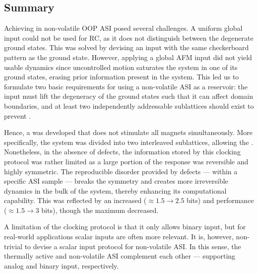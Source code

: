\subsection{Summary}
Achieving  in non-volatile OOP ASI posed several challenges.
A uniform global input could not be used for RC, as it does not distinguish between the degenerate ground states.
This was solved by devising an input with the same checkerboard pattern as the  ground state.
However, applying a global AFM input did not yield usable dynamics since uncontrolled  motion saturates the system in one of its ground states, erasing prior information present in the system.
This led us to formulate two basic requirements for using a non-volatile ASI as a reservoir: the input must lift the degeneracy of the ground states such that it can affect domain boundaries, and at least two independently addressable sublattices should exist to prevent . \par
Hence, a  was developed that does not stimulate all magnets simultaneously.
More specifically, the system was divided into two interleaved sublattices, allowing the .
Nonetheless, in the absence of defects, the information stored by this clocking protocol was rather limited as a large portion of the response was reversible and highly symmetric.
The reproducible disorder provided by defects --- within a specific ASI sample --- breaks the symmetry and creates more irreversible dynamics in the bulk of the system, thereby enhancing its computational capability.
This was reflected by an increased  ($\approx 1.5 \rightarrow 2.5$ bits) and  performance ($\approx 1.5 \rightarrow 3$ bits), though the maximum  decreased. \par
A limitation of the clocking protocol is that it only allows binary input, but for real-world applications scalar inputs are often more relevant.
It is, however, non-trivial to devise a scalar input protocol for non-volatile ASI.
In this sense, the thermally active and non-volatile ASI complement each other --- supporting analog and binary input, respectively.


